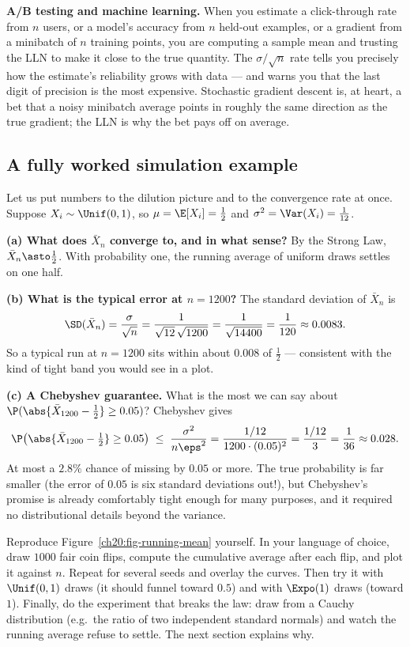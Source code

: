 \begin{applicationbox}
\textbf{A/B testing and machine learning.} When you estimate a click-through rate from $n$ users, or a model's accuracy from $n$ held-out examples, or a gradient from a minibatch of $n$ training points, you are computing a sample mean and trusting the LLN to make it close to the true quantity. The $\sigma/\sqrt n$ rate tells you precisely how the estimate's reliability grows with data --- and warns you that the last digit of precision is the most expensive. Stochastic gradient descent is, at heart, a bet that a noisy minibatch average points in roughly the same direction as the true gradient; the LLN is why the bet pays off on average.
\end{applicationbox}

\subsection{A fully worked simulation example}

Let us put numbers to the dilution picture and to the convergence rate at once. Suppose $X_i \sim \Unif(0,1)$, so $\mu = \E[X_i] = \tfrac12$ and $\sigma^2 = \Var(X_i) = \tfrac1{12}$.

\textbf{(a) What does $\bar X_n$ converge to, and in what sense?} By the Strong Law, $\bar X_n \asto \tfrac12$. With probability one, the running average of uniform draws settles on one half.

\textbf{(b) What is the typical error at $n = 1200$?} The standard deviation of $\bar X_n$ is
\[
  \SD(\bar X_n) = \frac{\sigma}{\sqrt n} = \frac{1}{\sqrt{12}\,\sqrt{1200}} = \frac{1}{\sqrt{14400}} = \frac{1}{120} \approx 0.0083.
\]
So a typical run at $n=1200$ sits within about $0.008$ of $\tfrac12$ --- consistent with the kind of tight band you would see in a plot.

\textbf{(c) A Chebyshev guarantee.} What is the most we can say about $\P(\abs{\bar X_{1200} - \tfrac12} \ge 0.05)$? Chebyshev gives
\[
  \P\bigl(\abs{\bar X_{1200} - \tfrac12} \ge 0.05\bigr) \;\le\; \frac{\sigma^2}{n\eps^2} = \frac{1/12}{1200\cdot (0.05)^2} = \frac{1/12}{3} = \frac{1}{36} \approx 0.028.
\]
At most a $2.8\%$ chance of missing by $0.05$ or more. The true probability is far smaller (the error of $0.05$ is six standard deviations out!), but Chebyshev's promise is already comfortably tight enough for many purposes, and it required no distributional details beyond the variance.

\begin{labbox}
Reproduce Figure~\ref{ch20:fig-running-mean} yourself. In your language of choice, draw $1000$ fair coin flips, compute the cumulative average after each flip, and plot it against $n$. Repeat for several seeds and overlay the curves. Then try it with $\Unif(0,1)$ draws (it should funnel toward $0.5$) and with $\Expo(1)$ draws (toward $1$). Finally, do the experiment that breaks the law: draw from a Cauchy distribution (e.g.\ the ratio of two independent standard normals) and watch the running average refuse to settle. The next section explains why.
\end{labbox}


